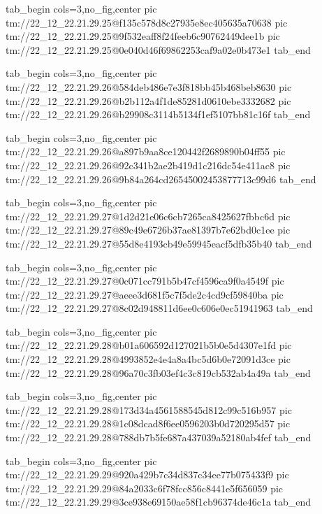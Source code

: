  
 
 
 
 

\qqSecCmtScr


\ifcmt
  tab_begin cols=3,no_fig,center
    pic tm://22_12_22.21.29.25@f135c578d8c27935e8ec405635a70638
    pic tm://22_12_22.21.29.25@9f532eaff8f24feeb6c90762449dee1b
    pic tm://22_12_22.21.29.25@0e040d46f69862253caf9a02e0b473e1
  tab_end
\fi


\ifcmt
  tab_begin cols=3,no_fig,center
    pic tm://22_12_22.21.29.26@584deb486e7e3f818bb45b468beb8630
    pic tm://22_12_22.21.29.26@b2b112a4f1de85281d0610ebe3332682
    pic tm://22_12_22.21.29.26@b29908c3114b5134f1ef5107bb81c16f
  tab_end
\fi


\ifcmt
  tab_begin cols=3,no_fig,center
    pic tm://22_12_22.21.29.26@a897b9aa8ce120442f2689890b04ff55
    pic tm://22_12_22.21.29.26@92c341b2ae2b419d1c216dc54e411ac8
    pic tm://22_12_22.21.29.26@9b84a264cd26545002453877713c99d6
  tab_end
\fi


\ifcmt
  tab_begin cols=3,no_fig,center
    pic tm://22_12_22.21.29.27@1d2d21e06c6cb7265ca8425627fbbc6d
    pic tm://22_12_22.21.29.27@89c49e6726b37ae81397b7e62bd0c1ee
    pic tm://22_12_22.21.29.27@55d8e4193cb49e59945eacf5dfb35b40
  tab_end
\fi


\ifcmt
  tab_begin cols=3,no_fig,center
    pic tm://22_12_22.21.29.27@0c071cc791b5b47cf4596ca9f0a4549f
    pic tm://22_12_22.21.29.27@aeee3d681f5c7f5de2c4cd9cf59840ba
    pic tm://22_12_22.21.29.27@8c02d948811d6ee0c606e0ec51941963
  tab_end
\fi


\ifcmt
  tab_begin cols=3,no_fig,center
    pic tm://22_12_22.21.29.28@b01a606592d127021b5b0e5d4307e1fd
    pic tm://22_12_22.21.29.28@4993852e4e4a8a4bc5d6b0e72091d3ce
    pic tm://22_12_22.21.29.28@96a70c3fb03ef4c3c819cb532ab4a49a
  tab_end
\fi


\ifcmt
  tab_begin cols=3,no_fig,center
    pic tm://22_12_22.21.29.28@173d34a4561588545d812c99c516b957
    pic tm://22_12_22.21.29.28@1c08dcad8f6ee0596203b0d720295d57
    pic tm://22_12_22.21.29.28@788db7b5fe687a437039a52180ab4fef
  tab_end
\fi


\ifcmt
  tab_begin cols=3,no_fig,center
    pic tm://22_12_22.21.29.29@920a429b7c34d837c34ee77b075433f9
    pic tm://22_12_22.21.29.29@84a2033c6f78fcc856c8441e5f656059
    pic tm://22_12_22.21.29.29@3ce938e69150ae58f1cb96374de46c1a
  tab_end
\fi


